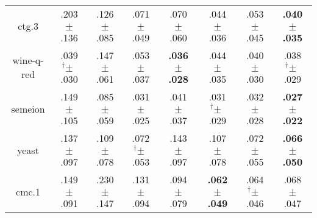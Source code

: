 \begin{tabular}{|c|ccccccc|}
ctg.3 & .203$^{\phantom{\dag}}\pm^{\phantom{\dag}}$.136\cellcolor{red!40} & .126$^{\phantom{\dag}}\pm^{\phantom{\dag}}$.085\cellcolor{red!1} & .071$^{\phantom{\dag}}\pm^{\phantom{\dag}}$.049\cellcolor{green!24} & .070$^{\phantom{\dag}}\pm^{\phantom{\dag}}$.060\cellcolor{green!25} & .044$^{\phantom{\dag}}\pm^{\phantom{\dag}}$.036\cellcolor{green!38} & .053$^{\phantom{\dag}}\pm^{\phantom{\dag}}$.045\cellcolor{green!33} & \textbf{.040$^{\phantom{\dag}}\pm^{\phantom{\dag}}$.035}\cellcolor{green!40} \\
wine-q-red & .039$^{\dag}\pm^{\phantom{\dag}}$.030\cellcolor{green!37} & .147$^{\phantom{\dag}}\pm^{\phantom{\dag}}$.061\cellcolor{red!40} & .053$^{\phantom{\dag}}\pm^{\phantom{\dag}}$.037\cellcolor{green!28} & \textbf{.036$^{\phantom{\dag}}\pm^{\phantom{\dag}}$.028}\cellcolor{green!40} & .044$^{\phantom{\dag}}\pm^{\phantom{\dag}}$.035\cellcolor{green!34} & .040$^{\phantom{\dag}}\pm^{\phantom{\dag}}$.030\cellcolor{green!37} & .038$^{\dag}\pm^{\phantom{\dag}}$.029\cellcolor{green!38} \\
semeion & .149$^{\phantom{\dag}}\pm^{\phantom{\dag}}$.105\cellcolor{red!40} & .085$^{\phantom{\dag}}\pm^{\phantom{\dag}}$.059\cellcolor{green!2} & .031$^{\phantom{\dag}}\pm^{\phantom{\dag}}$.025\cellcolor{green!37} & .041$^{\phantom{\dag}}\pm^{\phantom{\dag}}$.037\cellcolor{green!31} & .031$^{\dag}\pm^{\phantom{\dag}}$.029\cellcolor{green!37} & .032$^{\phantom{\dag}}\pm^{\phantom{\dag}}$.028\cellcolor{green!37} & \textbf{.027$^{\phantom{\dag}}\pm^{\phantom{\dag}}$.022}\cellcolor{green!40} \\
yeast & .137$^{\phantom{\dag}}\pm^{\phantom{\dag}}$.097\cellcolor{red!34} & .109$^{\phantom{\dag}}\pm^{\phantom{\dag}}$.078\cellcolor{red!4} & .072$^{\dag}\pm^{\phantom{\dag}}$.053\cellcolor{green!33} & .143$^{\phantom{\dag}}\pm^{\phantom{\dag}}$.097\cellcolor{red!40} & .107$^{\phantom{\dag}}\pm^{\phantom{\dag}}$.078\cellcolor{red!2} & .072$^{\phantom{\dag}}\pm^{\phantom{\dag}}$.055\cellcolor{green!33} & \textbf{.066$^{\phantom{\dag}}\pm^{\phantom{\dag}}$.050}\cellcolor{green!40} \\
cmc.1 & .149$^{\phantom{\dag}}\pm^{\phantom{\dag}}$.091\cellcolor{red!1} & .230$^{\phantom{\dag}}\pm^{\phantom{\dag}}$.147\cellcolor{red!40} & .131$^{\phantom{\dag}}\pm^{\phantom{\dag}}$.094\cellcolor{green!7} & .094$^{\phantom{\dag}}\pm^{\phantom{\dag}}$.079\cellcolor{green!24} & \textbf{.062$^{\phantom{\dag}}\pm^{\phantom{\dag}}$.049}\cellcolor{green!40} & .064$^{\dag}\pm^{\phantom{\dag}}$.046\cellcolor{green!39} & .068$^{\phantom{\dag}}\pm^{\phantom{\dag}}$.047\cellcolor{green!37} \\

\end{tabular}
